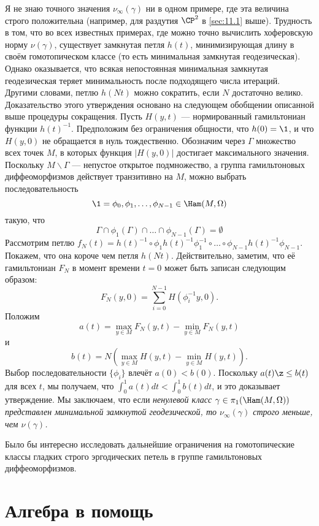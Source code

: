Я не знаю точного значения $\nu_\infty (\gamma)$ ни в одном примере, где эта величина строго положительна (например, для раздутия $\CP^2$ в \ref{sec:11.1} выше).
Трудность в том, что во всех известных примерах, где можно точно вычислить хоферовскую норму $\nu(\gamma)$, существует замкнутая петля $h(t)$, минимизирующая длину в своём гомотопическом классе (то есть минимальная замкнутая геодезическая).
Однако оказывается, что всякая непостоянная минимальная замкнутая геодезическая теряет минимальность после подходящего числа итераций.
Другими словами, петлю $h(Nt)$ можно сократить, если $N$ достаточно велико.
Доказательство этого утверждения основано на следующем обобщении описанной выше процедуры сокращения.
Пусть $H(y, t)$ --- нормированный гамильтониан функции $h(t)^{-1}$.
Предположим без ограничения общности, что $h(0) = \1$, и что $H(y,0)$ не обращается в нуль тождественно.
Обозначим через $\Gamma$ множество всех точек $M$, в которых функция $|H(y, 0)|$ достигает максимального значения.
Поскольку $M \backslash \Gamma$ --- непустое открытое подмножество, а группа гамильтоновых диффеоморфизмов действует транзитивно на $M$, можно выбрать последовательность 
\[\1=\phi_0,\phi_1,\dots,\phi_{N-1}\in\Ham(M,\Omega)\]
такую, что 
\[\Gamma\cap\phi_1(\Gamma)\cap\dots\cap\phi_{N-1}(\Gamma)=\emptyset\]
Рассмотрим петлю $f_N(t) = h(t)^{-1} \circ \phi_1h(t)^{-1}\phi_1^{-1} \circ \dots \circ \phi_{N-1}h(t)^{-1}\phi_{N-1}$.
Покажем, что она короче чем петля $h(Nt)$.
Действительно, заметим, что её гамильтониан $F_N$ в момент времени $t = 0$ может быть записан следующим образом:
\[F_N(y,0) = \sum_{i=0}^{N-1} H(\phi_i^{-1}y, 0).\]
Положим
\[a(t)
=
\max_{y\in M} F_N(y, t) - \min_{y\in M}  F_N(y, t)
\]
и
\[b(t)
=
N(\max_{y\in M} H(y, t) - \min_{y\in M}  H(y, t)).
\]
Выбор последовательности $\{\phi_i\}$ влечёт $a(0) < b(0)$.
Поскольку $a(t) \z\le b(t)$ для всех $t$, мы получаем, что $\int_0^1a(t)dt < \int_0^1 b(t)dt$, и это доказывает утверждение.
Мы заключаем, что если \textit{ненулевой класс $\gamma\in \pi_1(\Ham(M, \Omega))$ представлен минимальной замкнутой геодезической, то $\nu_\infty (\gamma)$ строго меньше, чем $\nu(\gamma)$.}

Было бы интересно исследовать дальнейшие ограничения на гомотопические классы гладких строго эргодических петель в группе гамильтоновых диффеоморфизмов.

\section{Алгебра в помощь}

